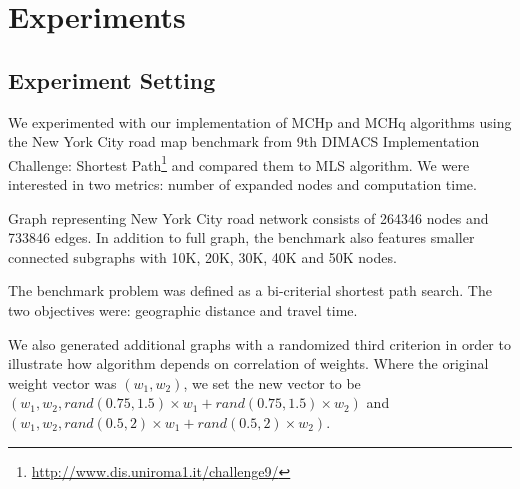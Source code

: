


\section{Experiments}
\label{secExperiments}

\subsection{Experiment Setting}
We experimented with our implementation of MCHp and MCHq algorithms using the New York City road map benchmark from 9th DIMACS Implementation Challenge: Shortest Path\footnote{
\url{http://www.dis.uniroma1.it/challenge9/}} and compared them to MLS algorithm. We were interested in two metrics: number of expanded nodes and computation time.

Graph representing New York City road network consists of 264346 nodes and 733846 edges. In addition to full graph, the benchmark also features smaller connected subgraphs with 10K, 20K, 30K, 40K and 50K nodes. 

The benchmark problem was defined as a bi-criterial shortest path search. The two objectives were: geographic distance and travel time. 

We also generated additional graphs with a randomized third criterion in order to illustrate how algorithm depends on correlation of weights. Where the original weight vector was $(w_1,w_2)$, we set the new vector to be $(w_1,w_2,rand(0.75,1.5) \times w_1 + rand(0.75,1.5) \times w_2)$ and $(w_1,w_2,rand(0.5,2) \times w_1 + rand(0.5,2) \times w_2)$. 

